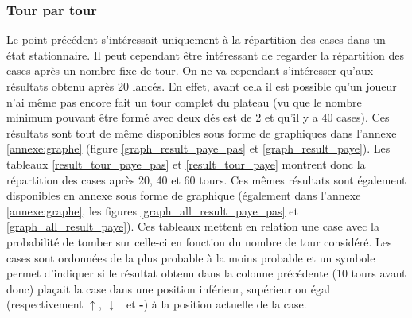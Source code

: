 \documentclass[letterpaper]{article}
\newcommand{\caseUp}[1][]{#1\textcolor[HTML]{008000}{$\mathbf{\uparrow}$}}
\newcommand{\caseStable}[1][]{#1\textcolor[HTML]{3779dd}{\textbf{-}}}
\newcommand{\caseDown}[1][]{#1\textcolor[HTML]{dd3737}{$\mathbf{\downarrow}$}}
\begin{document}
    \subsubsection{Tour par tour}
      Le point précédent s'intéressait uniquement à la répartition des cases dans un état
      stationnaire.  Il peut cependant être intéressant de regarder la répartition des cases
      après un nombre fixe de tour.  On ne va cependant s'intéresser qu'aux résultats obtenu
      après 20 lancés.  En effet, avant cela il est possible qu'un joueur n'ai même pas encore
      fait un tour complet du plateau (vu que le nombre minimum pouvant être formé avec deux dés 
      est de 2 et qu'il y a 40 cases).  Ces résultats sont tout de même disponibles sous forme de
      graphiques dans l'annexe \ref{annexe:graphe} (figure \ref{graph_result_paye_pas} et 
      \ref{graph_result_paye}).  Les tableaux \ref{result_tour_paye_pas} et \ref{result_tour_paye} 
      montrent donc la répartition des cases après 20, 40 et 60 tours.  Ces mêmes résultats 
      sont également disponibles en annexe sous forme de graphique (également dans l'annexe
      \ref{annexe:graphe}, les figures \ref{graph_all_result_paye_pas} et \ref{graph_all_result_paye}).  
      Ces tableaux mettent en relation une case avec la probabilité de tomber sur celle-ci en fonction du
      nombre de tour considéré.  Les cases sont ordonnées de la plus probable à la moins probable
      et un symbole permet d'indiquer si le résultat obtenu dans la colonne précédente (10 tours avant donc)
      plaçait la case dans une position inférieur, supérieur ou égal (respectivement \caseUp, \caseDown~ 
      et \caseStable) à la position actuelle de la case.
      
\end{document}
